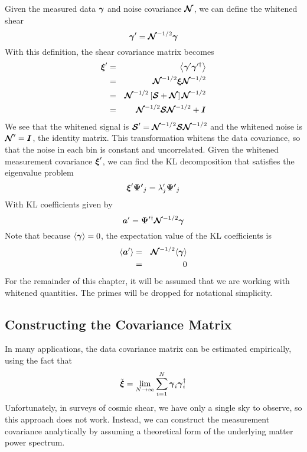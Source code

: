 Given the measured data $\boldsymbol{\gamma}$ and noise covariance
$\boldsymbol{\mathcal{N}}$, we can define the whitened shear
\begin{equation}
  \boldsymbol{\gamma}^\prime = \boldsymbol{\mathcal{N}}^{-1/2} \boldsymbol{\gamma}
\end{equation}
With this definition, the shear covariance matrix becomes
\begin{eqnarray}
  \boldsymbol{\xi}^\prime 
  &=& \left\langle \boldsymbol{\gamma}^\prime 
  \boldsymbol{\gamma}^{\prime\dagger}\right\rangle \nonumber\\
  &=& \boldsymbol{\mathcal{N}}^{-1/2}\boldsymbol{\xi}
  \boldsymbol{\mathcal{N}}^{-1/2} \nonumber\\
  &=& \boldsymbol{\mathcal{N}}^{-1/2}\left[
    \boldsymbol{\mathcal{S}} + \boldsymbol{\mathcal{N}}
    \right]\boldsymbol{\mathcal{N}}^{-1/2} \nonumber\\
  &=& \boldsymbol{\mathcal{N}}^{-1/2}\boldsymbol{\mathcal{S}}\boldsymbol{\mathcal{N}}^{-1/2} + \boldsymbol{I}
\end{eqnarray}
We see that the whitened signal is $\boldsymbol{\mathcal{S}}^\prime = 
\boldsymbol{\mathcal{N}}^{-1/2}\boldsymbol{\mathcal{S}}\boldsymbol{\mathcal{N}}^{-1/2}$
and the whitened noise is $\boldsymbol{\mathcal{N}}^\prime = \boldsymbol{I}$, the
identity matrix. This transformation whitens the data covariance,
so that the noise in each bin is constant and uncorrelated.  Given the
whitened measurement covariance $\boldsymbol{\xi}^\prime$, we can find the KL
decomposition that satisfies the eigenvalue problem
\begin{equation}
  \boldsymbol{\xi}^\prime \boldsymbol{\Psi^\prime}_j = 
  \lambda^\prime_j \boldsymbol{\Psi^\prime}_j
\end{equation}
With KL coefficients given by
\begin{equation}
  \boldsymbol{a}^\prime = \boldsymbol{\Psi}^{\prime\dagger}
  \boldsymbol{\mathcal{N}}^{-1/2}\boldsymbol{\gamma}
\end{equation}
Note that because $\langle\boldsymbol{\gamma}\rangle = 0$,
the expectation value of the KL coefficients is
\begin{eqnarray}
  \langle\boldsymbol{a}^\prime\rangle 
  &=& \boldsymbol{\mathcal{N}}^{-1/2}\langle\boldsymbol{\gamma}\rangle\nonumber\\
  &=& 0
\end{eqnarray}
For the remainder of this chapter, it will be assumed that we are working with
whitened quantities.  The primes will be dropped for notational simplicity.

\subsection{Constructing the Covariance Matrix}
In many applications, the data covariance matrix can be estimated
empirically, using the fact that
\begin{equation}
  \tilde{\boldsymbol{\xi}} = \lim_{N\to\infty} \sum_{i=1}^N 
  \boldsymbol{\gamma}_i \boldsymbol{\gamma}_i^\dagger
\end{equation}
Unfortunately, in surveys of cosmic shear, we have only a single sky to
observe, so this approach does not work.  Instead, we can construct the
measurement covariance analytically by assuming a theoretical form of the
underlying matter power spectrum.

